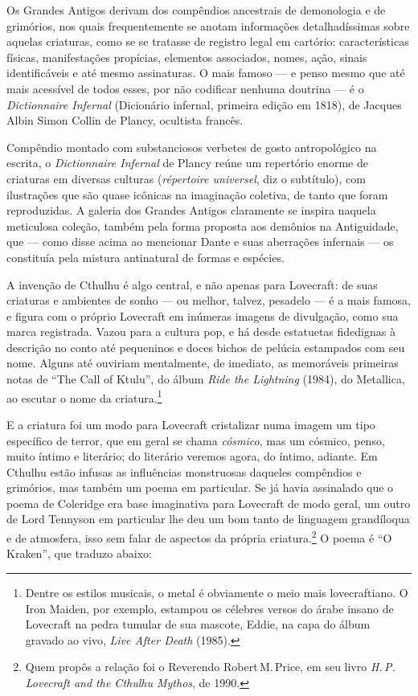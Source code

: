 Os Grandes Antigos derivam dos compêndios ancestrais de demonologia e de
grimórios, nos quais frequentemente se anotam informações detalhadíssimas
sobre aquelas criaturas, como se se tratasse de registro legal em
cartório: características físicas, manifestações propícias, elementos
associados, nomes, ação, sinais identificáveis e até mesmo assinaturas.
O mais famoso --- e penso mesmo que até mais acessível de todos esses,
por não codificar nenhuma doutrina --- é o \emph{Dictionnaire Infernal}
(Dicionário infernal, primeira edição em 1818), de Jacques Albin Simon Collin de Plancy, ocultista francês.

Compêndio montado com substanciosos verbetes de gosto antropológico na
escrita, o \emph{Dictionnaire Infernal} de Plancy reúne um repertório
enorme de criaturas em diversas culturas (\emph{répertoire universel},
diz o subtítulo), com ilustrações que são quase icônicas na imaginação
coletiva, de tanto que foram reproduzidas. A galeria dos Grandes Antigos
claramente se inspira naquela meticulosa coleção, também pela forma
proposta aos demônios na Antiguidade, que --- como disse acima ao
mencionar Dante e suas aberrações infernais --- os constituía pela
mistura antinatural de formas e espécies.

A invenção de Cthulhu é algo central, e não apenas para Lovecraft: de
suas criaturas e ambientes de sonho --- ou melhor, talvez, pesadelo
--- é a mais famosa, e figura com o próprio Lovecraft em inúmeras
imagens de divulgação, como sua marca registrada. Vazou para a cultura
pop, e há desde estatuetas fidedignas à descrição no conto até
pequeninos e doces bichos de pelúcia estampados com seu nome. Alguns até
ouviriam mentalmente, de imediato, as memoráveis primeiras notas de
``The Call of Ktulu'', do álbum \emph{Ride the Lightning} (1984), do
Metallica, ao escutar o nome da criatura.\footnote{Dentre os estilos
  musicais, o metal é obviamente o meio mais lovecraftiano. O Iron
  Maiden, por exemplo, estampou os célebres versos do árabe insano de
  Lovecraft na pedra tumular de sua mascote, Eddie, na capa do álbum
  gravado ao vivo, \emph{Live After Death} (1985).}

E a criatura foi um modo para Lovecraft cristalizar numa imagem um tipo
específico de terror, que em geral se chama \emph{cósmico}, mas um cósmico,
penso, muito íntimo e literário; do literário veremos agora, do íntimo,
adiante. Em Cthulhu estão infusas as influências monstruosas daqueles
compêndios e grimórios, mas também um poema em particular. Se já havia
assinalado que o poema de Coleridge era base imaginativa para Lovecraft
de modo geral, um outro de Lord Tennyson em particular lhe
deu um bom tanto de linguagem grandíloqua e de atmosfera, isso sem falar de
aspectos da própria criatura.\footnote{Quem propôs a relação foi o
  Reverendo Robert\,M.\,Price, em seu livro \emph{H.\,P.\,Lovecraft and the
  Cthulhu Mythos}, de 1990.} O poema é ``O Kraken'', que traduzo
abaixo:

